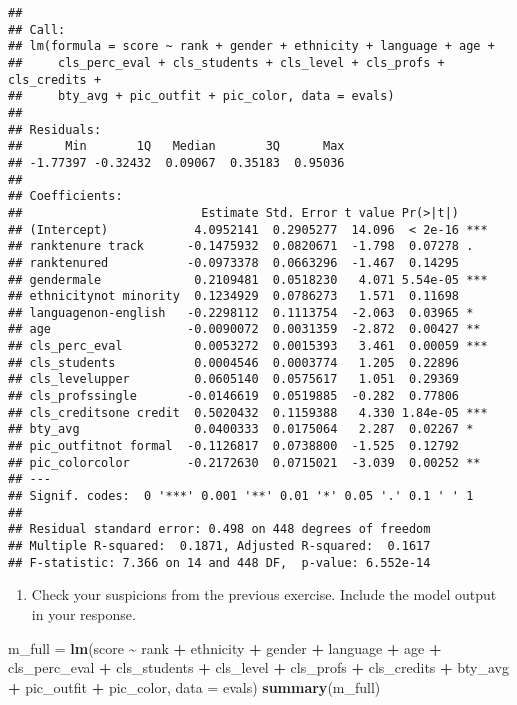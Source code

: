 \documentclass[
]{article}
\newenvironment{Shaded}{\begin{snugshade}}{\end{snugshade}}
\newcommand{\AttributeTok}[1]{\textcolor[rgb]{0.13,0.29,0.53}{#1}}
\newcommand{\FunctionTok}[1]{\textcolor[rgb]{0.13,0.29,0.53}{\textbf{#1}}}
\newcommand{\NormalTok}[1]{#1}
\newcommand{\OtherTok}[1]{\textcolor[rgb]{0.56,0.35,0.01}{#1}}
\newcommand{\SpecialCharTok}[1]{\textcolor[rgb]{0.81,0.36,0.00}{\textbf{#1}}}
\providecommand{\tightlist}{%
  \setlength{\itemsep}{0pt}\setlength{\parskip}{0pt}}
\begin{document}
\begin{verbatim}
## 
## Call:
## lm(formula = score ~ rank + gender + ethnicity + language + age + 
##     cls_perc_eval + cls_students + cls_level + cls_profs + cls_credits + 
##     bty_avg + pic_outfit + pic_color, data = evals)
## 
## Residuals:
##      Min       1Q   Median       3Q      Max 
## -1.77397 -0.32432  0.09067  0.35183  0.95036 
## 
## Coefficients:
##                         Estimate Std. Error t value Pr(>|t|)    
## (Intercept)            4.0952141  0.2905277  14.096  < 2e-16 ***
## ranktenure track      -0.1475932  0.0820671  -1.798  0.07278 .  
## ranktenured           -0.0973378  0.0663296  -1.467  0.14295    
## gendermale             0.2109481  0.0518230   4.071 5.54e-05 ***
## ethnicitynot minority  0.1234929  0.0786273   1.571  0.11698    
## languagenon-english   -0.2298112  0.1113754  -2.063  0.03965 *  
## age                   -0.0090072  0.0031359  -2.872  0.00427 ** 
## cls_perc_eval          0.0053272  0.0015393   3.461  0.00059 ***
## cls_students           0.0004546  0.0003774   1.205  0.22896    
## cls_levelupper         0.0605140  0.0575617   1.051  0.29369    
## cls_profssingle       -0.0146619  0.0519885  -0.282  0.77806    
## cls_creditsone credit  0.5020432  0.1159388   4.330 1.84e-05 ***
## bty_avg                0.0400333  0.0175064   2.287  0.02267 *  
## pic_outfitnot formal  -0.1126817  0.0738800  -1.525  0.12792    
## pic_colorcolor        -0.2172630  0.0715021  -3.039  0.00252 ** 
## ---
## Signif. codes:  0 '***' 0.001 '**' 0.01 '*' 0.05 '.' 0.1 ' ' 1
## 
## Residual standard error: 0.498 on 448 degrees of freedom
## Multiple R-squared:  0.1871, Adjusted R-squared:  0.1617 
## F-statistic: 7.366 on 14 and 448 DF,  p-value: 6.552e-14
\end{verbatim}

\begin{enumerate}
\def\labelenumi{\arabic{enumi}.}
\setcounter{enumi}{11}
\tightlist
\item
  Check your suspicions from the previous exercise. Include the model
  output in your response.
\end{enumerate}

\begin{Shaded}
\begin{Highlighting}[]
\NormalTok{m\_full }\OtherTok{=} \FunctionTok{lm}\NormalTok{(score }\SpecialCharTok{\textasciitilde{}}\NormalTok{ rank }\SpecialCharTok{+}\NormalTok{ ethnicity }\SpecialCharTok{+}\NormalTok{ gender }\SpecialCharTok{+}\NormalTok{ language }\SpecialCharTok{+}\NormalTok{ age }\SpecialCharTok{+}\NormalTok{ cls\_perc\_eval }\SpecialCharTok{+}\NormalTok{ cls\_students }\SpecialCharTok{+}\NormalTok{ cls\_level }\SpecialCharTok{+}\NormalTok{ cls\_profs }\SpecialCharTok{+}\NormalTok{ cls\_credits }\SpecialCharTok{+}\NormalTok{ bty\_avg }\SpecialCharTok{+}\NormalTok{ pic\_outfit }\SpecialCharTok{+}\NormalTok{ pic\_color, }\AttributeTok{data =}\NormalTok{ evals)}
\FunctionTok{summary}\NormalTok{(m\_full)}
\end{Highlighting}
\end{Shaded}
\end{document}

